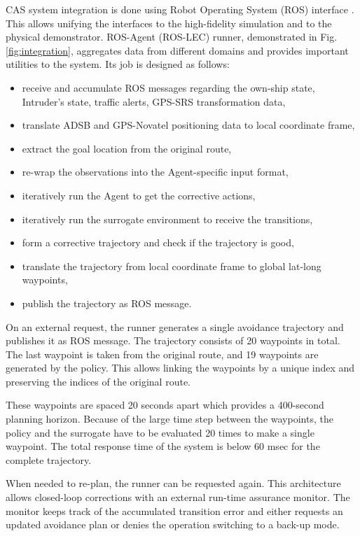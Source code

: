CAS system integration is done using Robot Operating System (ROS) interface \cite{quigley2009ros}. This allows unifying the interfaces to the high-fidelity simulation and to the physical demonstrator.
ROS-Agent (ROS-LEC) runner, demonstrated in Fig. \ref{fig:integration}, aggregates data from different domains and provides important utilities to the system. Its job is designed as follows: 
\begin{itemize}
	\item receive and accumulate ROS messages regarding the own-ship state,
	Intruder's state, traffic alerts, GPS-SRS transformation data,
	\item translate ADSB and GPS-Novatel positioning data to local coordinate frame,
	\item extract the goal location from the original route,
	\item re-wrap the observations into the Agent-specific input format,
	\item iteratively run the Agent to get the corrective actions,
	\item iteratively run the surrogate environment to receive the transitions,
	\item form a corrective trajectory and check if the trajectory is good,
	\item translate the trajectory from local coordinate frame to global lat-long waypoints,
	\item publish the trajectory as ROS message.
\end{itemize}

On an external request, the runner generates a single avoidance trajectory and publishes it as ROS message. The trajectory consists of 20 waypoints in total. The last waypoint is taken from the original route, and 19 waypoints are generated by the policy. This allows linking the waypoints by a unique index and preserving the indices of the original route.

These waypoints are spaced 20 seconds apart which provides a 400-second planning horizon. 
Because of the large time step between the waypoints, the policy and the surrogate have to be evaluated 20 times to make a single waypoint. The total response time of the system is below 60 msec for the complete trajectory.

When needed to re-plan, the runner can be requested again. This architecture allows closed-loop corrections with an external run-time assurance monitor. The monitor keeps track of the accumulated transition error and either requests an updated avoidance plan or denies the operation switching to a back-up mode.
